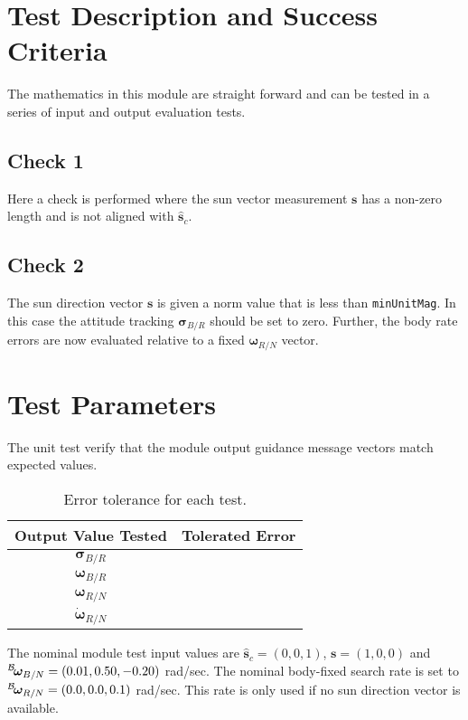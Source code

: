 
\section{Test Description and Success Criteria}
The mathematics in this module are straight forward and can be tested in a series of input and output evaluation tests.


\subsection{Check 1}
Here a check is performed where the sun vector measurement $\bm s$ has a non-zero length and is not aligned with $\hat{\bm s}_{c}$.  

\subsection{Check 2}
The sun direction vector $\bm s$ is given a norm value that is less than {\tt minUnitMag}.  In this case the attitude tracking $\bm\sigma_{B/R}$ should be set to zero.  Further, the body rate errors are now evaluated relative to a fixed $\bm\omega_{R/N}$ vector.  



\section{Test Parameters}
The unit test verify that the module output guidance message vectors match expected values.
\begin{table}[htbp]
	\caption{Error tolerance for each test.}
	\label{tab:errortol}
	\centering \fontsize{10}{10}\selectfont
	\begin{tabular}{ c | c } %
		\hline\hline
		\textbf{Output Value Tested}  & \textbf{Tolerated Error}  \\ 
		\hline
		$\bm\sigma_{B/R}$        & 	   \\ 
		$\bm\omega_{B/R}$        & \\ 
		$\bm\omega_{R/N}$        &  \\ 
		$\dot{\bm\omega}_{R/N}$        &   \\ 
		\hline\hline
	\end{tabular}
\end{table}

The nominal module test input values are $\hat{\bm s}_{c} = (0,0,1)$, $\bm s = (1,0,0)$ and $\leftexp{B}{\bm\omega}_{B/N} = (0.01, 0.50, -0.20)$ rad/sec.  The nominal body-fixed search rate is set to $\leftexp{B}{\bm\omega}_{R/N} = (0.0, 0.0, 0.1)$ rad/sec.  This rate is only used if no sun direction vector is available.  



